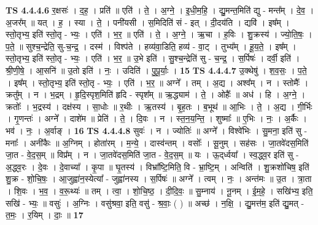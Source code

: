 \documentclass[17pt]{extarticle}
\begin{document}
                  \newline
                                \textbf{ TS 4.4.4.6} \newline
                  र॒क्षसः॑ । द॒ह॒ । प्रति॑ ॥ एति॑ । ते॒ । अ॒ग्ने॒ । इ॒धी॒म॒हि॒ । द्यु॒मन्त॒मिति॑ द्यु - मन्त᳚म् । दे॒व॒ । अ॒जर᳚म् ॥ यत् । ह॒ । स्या । ते॒ । पनी॑यसी । स॒मिदिति॑ सं - इत् । दी॒दय॑ति । द्यवि॑ । इष᳚म् । स्तो॒तृभ्य॒ इति॑ स्तो॒तृ - भ्यः॒ । एति॑ । भ॒र॒ ॥ एति॑ । ते॒ । अ॒ग्ने॒ । ऋ॒चा । ह॒विः । शु॒क्रस्य॑ । ज्यो॒ति॒षः॒ । प॒ते॒ ॥ सुश्च॒न्द्रेति॒ सु-च॒न्द्र॒ । दस्म॑ । विश्प॑ते । हव्य॑वा॒डिति॒ हव्य॑ - वा॒ट् । तुभ्य᳚म् । हू॒य॒ते॒ । इष᳚म् । स्तो॒तृभ्य॒ इति॑ स्तो॒तृ - भ्यः॒ । एति॑ । भ॒र॒ ॥ उ॒भे इति॑ । सु॒श्च॒न्द्रेति॑ सु - च॒न्द्र॒ । स॒र्पिषः॑ । दर्वी॒ इति॑ । श्री॒णी॒षे॒ । आ॒सनि॑ ॥ उ॒तो इति॑ । नः॒ । उदिति॑ । पु॒पू॒र्याः॒ । \textbf{  15} \newline
                  \newline
                                \textbf{ TS 4.4.4.7} \newline
                  उ॒क्थेषु॑ । श॒व॒सः॒ । प॒ते॒ । इष᳚म् । स्तो॒तृभ्य॒ इति॑ स्तो॒तृ - भ्यः॒ । एति॑ । भ॒र॒ ॥ अग्ने᳚ । तम् । अ॒द्य । अश्व᳚म् । न । स्तोमैः᳚ । क्रतु᳚म् । न । भ॒द्रम् । हृ॒दि॒स्पृश॒मिति॑ हृदि - स्पृश᳚म् ॥ ऋ॒द्ध्याम॑ । ते॒ । ओहैः᳚ ॥ अध॑ । हि । अ॒ग्ने॒ । क्रतोः᳚ । भ॒द्रस्य॑ । दक्ष॑स्य । सा॒धोः ॥ र॒थीः । ऋ॒तस्य॑ । बृ॒ह॒तः । ब॒भूथ॑ ॥ आ॒भिः । ते॒ । अ॒द्य । गी॒र्भिः । गृ॒णन्तः॑ । अग्ने᳚ । दाशे॑म ॥ प्रेति॑ । ते॒ । दि॒वः । न । स्त॒न॒य॒न्ति॒ । शुष्माः᳚ ॥ ए॒भिः । नः॒ । अ॒र्कैः । भव॑ । नः॒ । अ॒र्वाङ् । \textbf{  16} \newline
                  \newline
                                \textbf{ TS 4.4.4.8} \newline
                  सुवः॑ । न । ज्योतिः॑ ॥ अग्ने᳚ । विश्वे॑भिः । सु॒मना॒ इति॑ सु - मनाः᳚ । अनी॑कैः ॥ अ॒ग्निम् । होता॑रम् । म॒न्ये॒ । दास्व॑न्तम् । वसोः᳚ । सू॒नुम् । सह॑सः । जा॒तवे॑दस॒मिति॑ जा॒त - वे॒द॒स॒म् ॥ विप्र᳚म् । न । जा॒तवे॑दस॒मिति॑ जा॒त - वे॒द॒स॒म् ॥ यः । ऊ॒द्‌र्ध्वया᳚ । स्व॒द्ध्व॒र इति॑ सु - अ॒द्ध्व॒रः । दे॒वः । दे॒वाच्या᳚ । कृ॒पा ॥ घृ॒तस्य॑ । विभ्रा᳚ष्टि॒मिति॒ वि - भ्रा॒ष्टि॒म् । अन्विति॑ । शु॒क्रशो॑चिष॒ इति॑ शु॒क्र - शो॒चि॒षः॒ । आ॒जुह्वा॑न॒स्येत्या᳚ - जुह्वा॑नस्य । स॒र्पिषः॑ ॥ अग्ने᳚ । त्वम् । नः॒ । अन्त॑मः ॥ उ॒त । त्रा॒ता । शि॒वः । भ॒व॒ । व॒रू॒थ्यः॑ ॥ तम् । त्वा॒ । शो॒चि॒ष्ठ॒ । दी॒दि॒वः॒ ॥ सु॒म्नाय॑ । नू॒नम् । ई॒म॒हे॒ । सखि॑भ्य॒ इति॒ सखि॑ - भ्यः॒ ॥ वसुः॑ । अ॒ग्निः । वसु॑श्रवा॒ इति॒ वसु॑ - श्र॒वाः॒ ( ) ॥ अच्छ॑ । न॒क्षि॒ । द्यु॒मत्त॑म॒ इति॑ द्यु॒मत् - त॒मः॒ । र॒यिम् । दाः॒ ॥ \textbf{  17} \newline
\end{document}
